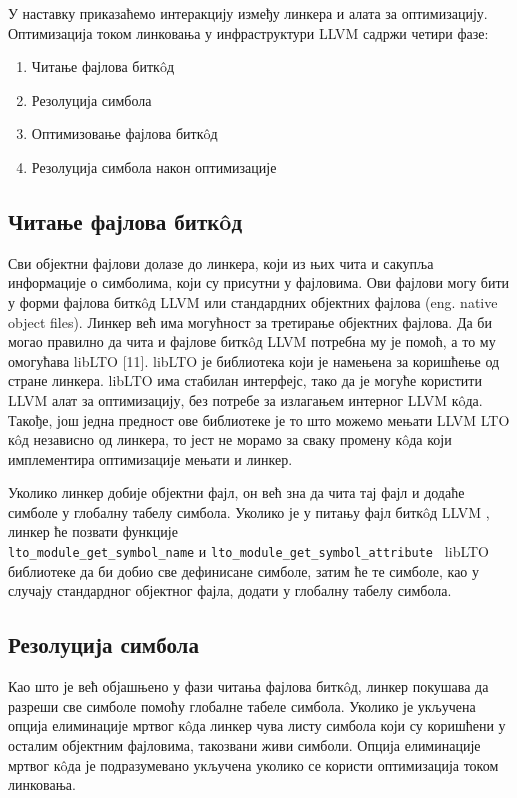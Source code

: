 \documentclass[12pt,oneside]{memoir}
\begin{document}
У наставку приказаћемо интеракцију између линкера и алата за оптимизацију.
Оптимизација током линковања у инфраструктури LLVM садржи четири фазе:
\begin{enumerate}
\item Читање фајлова битк\^{o}д 
\item Резолуција симбола
\item Оптимизовање фајлова битк\^{o}д
\item Резолуција симбола након оптимизације
\end{enumerate}

\subsection{Читање фајлова битк\^{o}д}
Сви објектни фајлови долазе до линкера, који из њих чита и сакупља информације
о симболима, који су присутни у фајловима.
Ови фајлови могу бити у форми фајлова битк\^{o}д LLVM или стандардних објектних
фајлова (eng. native object files).
Линкер већ има могућност за третирање објектних фајлова.
Да би могао
правилно да чита и фајлове битк\^{o}д LLVM  потребна му је помоћ, а то му омогућава
 libLTO [11].
libLTO је библиотека који је намењена за коришћење од стране линкера.
libLTO има стабилан интерфејс, тако да је могуће користити
LLVM алат за оптимизацију, без потребе за излагањем интерног LLVM к\^{o}да.
Такође, још једна предност ове библиотеке је то што можемо мењати LLVM LTO к\^{o}д независно
од линкера, то јест не морамо за сваку промену к\^{o}да који имплементира
оптимизације мењати и линкер.

Уколико линкер добије
објектни фајл, он већ зна да чита тај фајл и додаће симболе у глобалну табелу симбола.
Уколико је у питању фајл  битк\^{o}д LLVM , линкер ће позвати функције \\
\texttt{lto{\_}module{\_}get{\_}symbol{\_}name} и 
\texttt{lto{\_}module{\_}get{\_}symbol{\_}attribute }
libLTO библиотеке да би добио све дефинисане  симболе, затим ће те симболе, 
као у случају стандардног објектног фајла, додати у глобалну табелу симбола.

\subsection{Резолуција симбола}
Као што је већ објашњено у фази читања фајлова битк\^{o}д, линкер покушава да разреши све симболе помоћу
глобалне табеле симбола.
Уколико је укључена опција елиминације мртвог к\^{o}да линкер чува листу симбола који
су коришћени у осталим објектним фајловима, такозвани живи симболи.
Опција елиминације мртвог к\^{o}да је подразумевано укључена
уколико се користи оптимизација током линковања.
\end{document}
